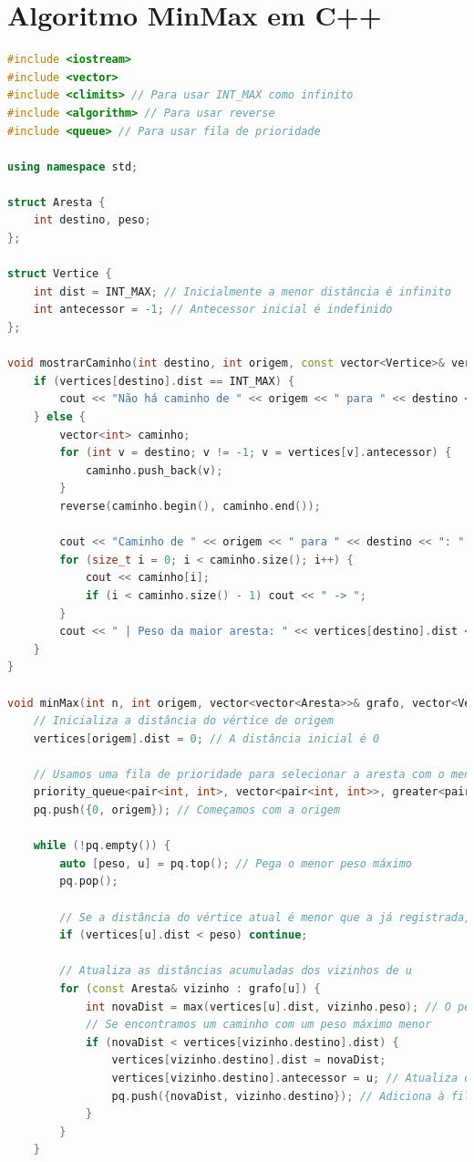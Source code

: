 \documentclass{article}
\begin{document}
\section{Algoritmo MinMax em C++}
\begin{lstlisting}[language=c++ ,caption = Exemplo C++]
#include <iostream>
#include <vector>
#include <climits> // Para usar INT_MAX como infinito
#include <algorithm> // Para usar reverse
#include <queue> // Para usar fila de prioridade

using namespace std;

struct Aresta {
    int destino, peso;
};

struct Vertice {
    int dist = INT_MAX; // Inicialmente a menor distância é infinito
    int antecessor = -1; // Antecessor inicial é indefinido
};

void mostrarCaminho(int destino, int origem, const vector<Vertice>& vertices) {
    if (vertices[destino].dist == INT_MAX) {
        cout << "Não há caminho de " << origem << " para " << destino << endl;
    } else {
        vector<int> caminho;
        for (int v = destino; v != -1; v = vertices[v].antecessor) {
            caminho.push_back(v);
        }
        reverse(caminho.begin(), caminho.end());

        cout << "Caminho de " << origem << " para " << destino << ": ";
        for (size_t i = 0; i < caminho.size(); i++) {
            cout << caminho[i];
            if (i < caminho.size() - 1) cout << " -> ";
        }
        cout << " | Peso da maior aresta: " << vertices[destino].dist << endl;
    }
}

void minMax(int n, int origem, vector<vector<Aresta>>& grafo, vector<Vertice>& vertices) {
    // Inicializa a distância do vértice de origem
    vertices[origem].dist = 0; // A distância inicial é 0

    // Usamos uma fila de prioridade para selecionar a aresta com o menor peso máximo
    priority_queue<pair<int, int>, vector<pair<int, int>>, greater<pair<int, int>>> pq; // par (peso, vértice)
    pq.push({0, origem}); // Começamos com a origem

    while (!pq.empty()) {
        auto [peso, u] = pq.top(); // Pega o menor peso máximo
        pq.pop();

        // Se a distância do vértice atual é menor que a já registrada, ignoramos
        if (vertices[u].dist < peso) continue;

        // Atualiza as distâncias acumuladas dos vizinhos de u
        for (const Aresta& vizinho : grafo[u]) {
            int novaDist = max(vertices[u].dist, vizinho.peso); // O peso máximo do caminho
            // Se encontramos um caminho com um peso máximo menor
            if (novaDist < vertices[vizinho.destino].dist) {
                vertices[vizinho.destino].dist = novaDist;
                vertices[vizinho.destino].antecessor = u; // Atualiza o antecessor
                pq.push({novaDist, vizinho.destino}); // Adiciona à fila de prioridade
            }
        }
    }


\end{lstlisting}
\end{document}
